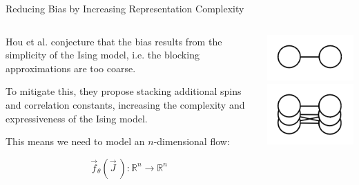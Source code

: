 \documentclass[aspectratio=169, 12pt]{beamer}
\begin{document}
\begin{frame}{Reducing Bias by Increasing Representation Complexity}

    \begin{columns}
        \begin{column}{.6\textwidth}

            Hou et al. conjecture that the bias results from the simplicity of the Ising model, i.e. the blocking approximations are too coarse. 

            \vspace{1em}
            
            To mitigate this, they propose stacking additional spins and correlation constants, increasing the complexity and expressiveness of the Ising model. 

            \vspace{1em}

            This means we need to model an $n$-dimensional flow:

            \[
            \vec{f}_\theta(\vec{J}\:) : \mathbb{R}^n \rightarrow \mathbb{R}^n
            \]

            
        \end{column}
        \begin{column}{.4\textwidth}
            \begin{center}
                \includegraphics[]{images/a1-edge.png}
                \includegraphics[]{images/a1e-edge.png}
            \end{center}
        \end{column}
    \end{columns}

\end{frame}
\end{document}
